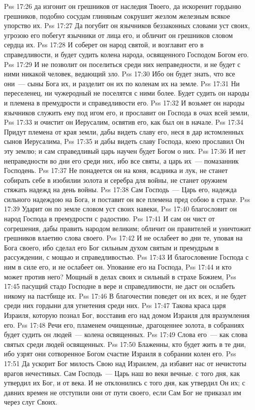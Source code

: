 \vs Pss 17:26
да изгонит он грешников от наследия Твоего, да искоренит гордыню
грешников, подобно сосудам глиняным сокрушит жезлом железным всякое упорство
их.
\vs Pss 17:27
Да погубит он язычников беззаконных словами уст своих, угрозою его
побегут язычники от лица его, и обличит он грешников словом сердца их.
\vs Pss 17:28
И соберет он народ святой, и возглавит его в справедливости, и будет
судить колена народа, освященного Господом Богом его.
\vs Pss 17:29
И не позволит он поселиться среди них неправедности, и не будет с
ними никакой человек, ведающий зло.
\vs Pss 17:30
Ибо он будет знать, что все они~--- сыны Бога их, и разделит он
их по коленам их на земле.
\vs Pss 17:31
Ни переселенец, ни чужеродный не поселятся с ними более. Будет
судить он народы и племена в премудрости и справедливости его.
\vs Pss 17:32
И возьмет он народы язычников служить ему под игом его, и прославит
он Господа в очах всей земли,
\vs Pss 17:33
и очистит он Иерусалим, освятив его, как был он в начале.
\vs Pss 17:34
Придут племена от края земли, дабы видеть славу его, неся в дар
истомленных сынов Иерусалима,
\vs Pss 17:35
и дабы видеть славу Господа, коею прославил Он эту землю; и сам
справедливый царь научен будет Богом о них.
\vs Pss 17:36
И нет неправедности во дни его среди них, ибо все святы, а царь
их~--- помазанник Господень.
\vs Pss 17:37
Не понадеется он на коня, всадника и лук, не станет собирать себе в
изобилии золота и серебра для войны, не станет оружием стяжать надежд на день
войны.
\vs Pss 17:38
Сам Господь~--- Царь его, надежда сильного надеждою на Бога, и
поставит он все племена пред собою в страхе.
\vs Pss 17:39
Ударит он по земле словом уст своих навеки,
\vs Pss 17:40
благословит он народ Господа в премудрости с радостию.
\vs Pss 17:41
И сам он чист от согрешения, дабы править народом великим;
обличит он правителей и уничтожит грешников влаетию слова своего.
\vs Pss 17:42
И не ослабеет во дни те, уповая на Бога своего, ибо сделал его Бог
сильным духом святым и премудрым в рассуждении, с мощью и справедливостью.
\vs Pss 17:43
И благословение Господа с ним в силе его, и не ослабеет он.
Упование его на Господа,
\vs Pss 17:44
и кто может против него?
Мощный в делах своих и сильный в страхе Божием,
\vs Pss 17:45
пасущий стадо Господне в вере и справедливости, не даст он ослабеть
никому на пастбище их.
\vs Pss 17:46
В благочестии поведет он их всех, и не будет среди них гордыни для
угнетения среди них.
\vs Pss 17:47
Такова краса царя Израиля, которую познал Бог, восставив его над
домом Израиля для вразумления его.
\vs Pss 17:48
Речи его, пламенем очищенные, драгоценнее золота, в собраниях будет
судить он людей~--- колена освященных.
\vs Pss 17:49
Слова его~--- как слова святых среди людей освященных.
\vs Pss 17:50
Блаженны, кто будет жить в те дни, ибо узрят они сотворенное Богом
счастие Израиля в собрании колен его.
\vs Pss 17:51
Да ускорит Бог милость Свою над Израилем, да избавит нас от
нечистоты врагов нечестивых. Сам Господь~--- Царь наш во веки вечные.
с того дня, как утвердил их Бог, и от века.
И не отклонились с того дня, как утвердил Он их; с давних времен не отступили
они от пути своего, если Сам Бог не приказал им через слуг Своих.

